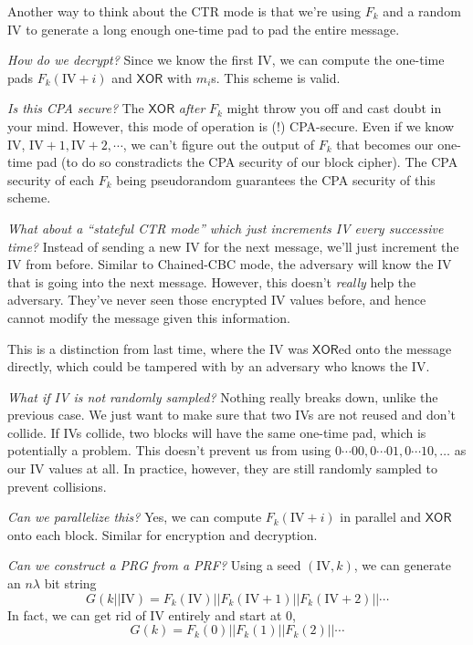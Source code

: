 Another way to think about the CTR mode is that we're using $F_k$ and a random IV to generate a long enough one-time pad to pad the entire message.


\emph{How do we decrypt?} Since we know the first IV, we can compute the one-time pads $F_k(\mathrm{IV} + i)$ and $\mathsf{XOR}$ with $m_i$s. This scheme is valid.

\emph{Is this CPA secure?} The $\mathsf{XOR}$ \emph{after} $F_k$ might throw you off and cast doubt in your mind. However, this mode of operation is (!) CPA-secure. Even if we know IV, $\mathrm{IV}+1, \mathrm{IV}+2, \cdots$, we can't figure out the output of $F_k$ that becomes our one-time pad (to do so constradicts the CPA security of our block cipher). The CPA security of each $F_k$ being pseudorandom guarantees the CPA security of this scheme.

\emph{What about a ``stateful CTR mode'' which just increments IV every successive time?} Instead of sending a new IV for the next message, we'll just increment the IV from before. Similar to Chained-CBC mode, the adversary will know the IV that is going into the next message. However, this doesn't \emph{really} help the adversary. They've never seen those encrypted IV values before, and hence cannot modify the message given this information.

This is a distinction from last time, where the IV was $\mathsf{XOR}$ed onto the message directly, which could be tampered with by an adversary who knows the IV.

\emph{What if IV is not randomly sampled?} Nothing really breaks down, unlike the previous case. We just want to make sure that two IVs are not reused and don't collide. If IVs collide, two blocks will have the same one-time pad, which is potentially a problem. This doesn't prevent us from using $0\cdots 00, 0\cdots 01, 0\cdots 10, \dots$ as our IV values at all. In practice, however, they are still randomly sampled to prevent collisions.

\emph{Can we parallelize this?} Yes, we can compute $F_k(\mathrm{IV} + i)$ in parallel and $\mathsf{XOR}$ onto each block. Similar for encryption and decryption.

\emph{Can we construct a PRG from a PRF?} Using a seed $(\mathrm{IV}, k)$, we can generate an $n\lambda$ bit string
\[G(k||\mathrm{IV}) = F_k(\mathrm{IV})||F_k(\mathrm{IV} + 1)||F_k(\mathrm{IV} + 2)||\cdots\]
In fact, we can get rid of IV entirely and start at $0$,
\[G(k) = F_k(0)||F_k(1)||F_k(2)||\cdots\]

